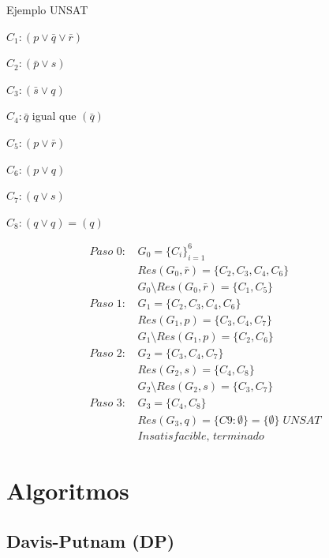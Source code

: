 \documentclass[12pt, twoside, openright]{report} %
\begin{document}
  
    Ejemplo UNSAT
	\begin{multicols}{2}

$C_{1}:(p \vee \bar{q} \vee \bar{r})$

$C_{2}:(\bar{p} \vee s)$

$C_{3}:(\bar{s} \vee q)$

$C_{4}: \bar{q}$ igual que $(\bar{q})$

$C_{5}:(p \vee \bar{r})$

$C_{6}:(p \vee q)$

$C_{7}: (q \vee s)$

$C_{8}:(q \vee q)=(q)$

\columnbreak

\begin{align*}
\textit{Paso 0: } &G_0 = \{C_i\}_{i=1}^6 \\
&Res(G_0, \bar{r}) = \{ C_2, C_3, C_4, C_6 \} \\
&G_0 \setminus Res(G_0, \bar{r}) = \{ C_1, C_5 \} \\
\textit{Paso 1: } &G_1 = \{C_2, C_3, C_4, C_6\} \\
&Res(G_1, p) = \{ C_3, C_4, C_7 \} \\
&G_1 \setminus Res(G_1, p) = \{ C_2, C_6 \} \\
\textit{Paso 2: } &G_2 = \{C_3, C_4, C_7\} \\
&Res(G_2, s) = \{ C_4, C_8 \} \\
&G_2 \setminus Res(G_2, s) = \{ C_3, C_7 \} \\
\textit{Paso 3: } &G_3 = \{C_4, C_8\} \\
&Res(G_3, q) = \{ C9: \emptyset \} = \{ \emptyset \} \; \textit{UNSAT} \\
&\textit{Insatisfacible, terminado}
\end{align*}

\end{multicols}

	\pagebreak
\section{Algoritmos}
\subsection{Davis-Putnam (DP)}
\end{document}
